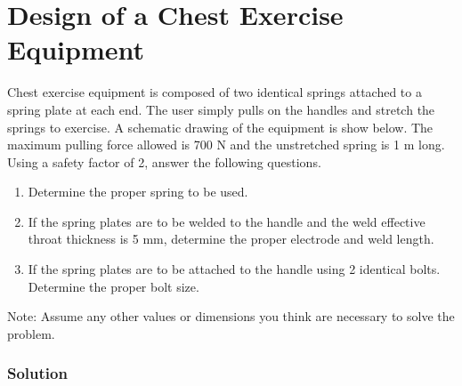 \documentclass[
10pt,
a4paper,
openany,
svgnames,
]{book}
\begin{document}
\section{Design of a Chest Exercise Equipment}

Chest exercise equipment is composed of two identical springs attached to a spring plate at each end. The user simply pulls on the handles and stretch the springs to exercise. A schematic drawing of the equipment is show below. The maximum pulling force allowed is 700 N and the unstretched spring is 1 m long. Using a safety factor of 2, answer the following questions.

  \begin{figure}[h]
    \centering
  \end{figure}

\begin{enumerate}
\item Determine the proper spring to be used.
\item If the spring plates are to be welded to the handle and the weld effective throat thickness is 5 mm, determine the proper electrode and weld length.
\item If the spring plates are to be attached to the handle using 2 identical bolts. Determine the proper bolt size.
\end{enumerate}
Note: Assume any other values or dimensions you think are necessary to solve the problem.

\subsubsection{Solution}
\end{document}
